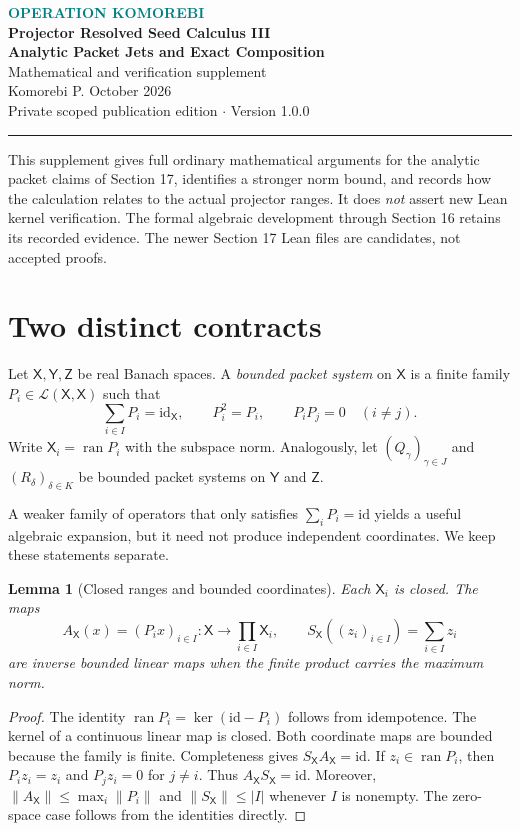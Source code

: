 \documentclass[11pt]{article}
\newtheorem{lemma}[theorem]{Lemma}
\theoremstyle{remark}\newtheorem{remark}[theorem]{Remark}
\newcommand{\X}{\mathsf X}\newcommand{\Y}{\mathsf Y}\newcommand{\Z}{\mathsf Z}
\newcommand{\norm}[1]{\left\lVert#1\right\rVert}
\newcommand{\id}{\mathrm{id}}
\newcommand{\op}{\operatorname}
\begin{document}
\begin{center}
{\small\bfseries\textcolor{teal}{OPERATION KOMOREBI}}\\[5pt]
{\Large\bfseries Projector Resolved Seed Calculus III}\\[7pt]
{\LARGE\bfseries Analytic Packet Jets and Exact Composition}\\[8pt]
{\large Mathematical and verification supplement}\\[8pt]
{\normalsize Komorebi P.  October 2026}\\[9pt]
{\small Private scoped publication edition \quad $\cdot$ \quad Version 1.0.0}
\end{center}
\vspace{6pt}
\noindent\rule{\linewidth}{.8pt}
\vspace{4pt}
This supplement gives full ordinary mathematical arguments for the analytic packet claims of Section 17, identifies a stronger norm bound, and records how the calculation relates to the actual projector ranges. It does \emph{not} assert new Lean kernel verification. The formal algebraic development through Section 16 retains its recorded evidence. The newer Section 17 Lean files are candidates, not accepted proofs.

\section{Two distinct contracts}
Let $\X,\Y,\Z$ be real Banach spaces. A \emph{bounded packet system} on $\X$ is a finite family $P_i\in\mathcal L(\X,\X)$ such that
\begin{equation}\label{eq:proj}
\sum_{i\in I}P_i=\id_{\X},\qquad P_i^2=P_i,\qquad P_iP_j=0\quad(i\ne j).
\end{equation}
Write $\X_i=\op{ran}P_i$ with the subspace norm. Analogously, let $(Q_\gamma)_{\gamma\in J}$ and $(R_\delta)_{\delta\in K}$ be bounded packet systems on $\Y$ and $\Z$.

A weaker family of operators that only satisfies $\sum_iP_i=\id$ yields a useful algebraic expansion, but it need not produce independent coordinates. We keep these statements separate.

\begin{lemma}[Closed ranges and bounded coordinates]\label{lem:closed}
Each $\X_i$ is closed. The maps
\[
A_{\X}(x)=(P_i x)_{i\in I}:\X\longrightarrow\prod_{i\in I}\X_i,
\qquad S_{\X}((z_i)_{i\in I})=\sum_{i\in I}z_i
\]
are inverse bounded linear maps when the finite product carries the maximum norm.
\end{lemma}
\begin{proof}
The identity $\op{ran}P_i=\ker(\id-P_i)$ follows from idempotence. The kernel of a continuous linear map is closed. Both coordinate maps are bounded because the family is finite. Completeness gives $S_{\X}A_{\X}=\id$. If $z_i\in\op{ran}P_i$, then $P_i z_i=z_i$ and $P_j z_i=0$ for $j\ne i$. Thus $A_{\X}S_{\X}=\id$. Moreover,
$\norm{A_{\X}}\le\max_i\norm{P_i}$ and
$\norm{S_{\X}}\le |I|$ whenever $I$ is nonempty. The zero-space case follows from the identities directly.
\end{proof}
\end{document}

